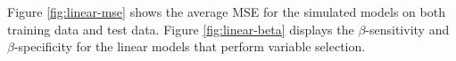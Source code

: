 \documentclass{article}
\begin{document}

	
	Figure \ref{fig:linear-mse} shows the average MSE for the simulated models on both training data and test data. Figure \ref{fig:linear-beta} displays the $\beta$-sensitivity and $\beta$-specificity for the linear models that perform variable selection.
	
\end{document}
